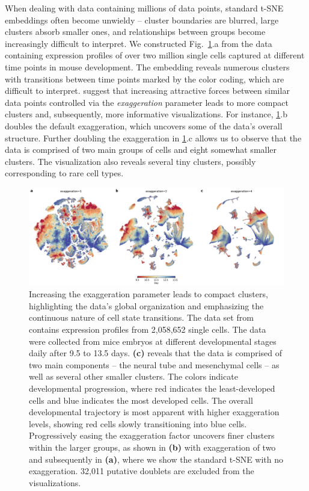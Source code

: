 \documentclass[article]{jss}
\begin{document}
When dealing with data containing millions of data points, standard t-SNE embeddings often become unwieldy -- cluster boundaries are blurred, large clusters absorb smaller ones, and relationships between groups become increasingly difficult to interpret. We constructed Fig.~\ref{fig:cao}.a from the data containing expression profiles of over two million single cells captured at different time points in mouse development. The embedding reveals numerous clusters with transitions between time points marked by the color coding, which are difficult to interpret. \citet{kobak2019art} suggest that increasing attractive forces between similar data points controlled via the \textit{exaggeration} parameter leads to more compact clusters and, subsequently, more informative visualizations. For instance, \ref{fig:cao}.b doubles the default exaggeration, which uncovers some of the data's overall structure. Further doubling the exaggeration in \ref{fig:cao}.c allows us to observe that the data is comprised of two main groups of cells and eight somewhat smaller clusters. The visualization also reveals several tiny clusters, possibly corresponding to rare cell types.

\begin{figure}[htbp]
  \includegraphics[width=\textwidth]{cao2019}
  \caption{\label{fig:cao}
  Increasing the exaggeration parameter leads to compact clusters, highlighting the data's global organization and emphasizing the continuous nature of cell state transitions. The data set from \citet{cao2019single} contains expression profiles from 2,058,652 single cells. The data were collected from mice embryos at different developmental stages daily after 9.5 to 13.5 days. \textbf{(c)} reveals that the data is comprised of two main components -- the neural tube and mesenchymal cells -- as well as several other smaller clusters. The colors indicate developmental progression, where red indicates the least-developed cells and blue indicates the most developed cells. The overall developmental trajectory is most apparent with higher exaggeration levels, showing red cells slowly transitioning into blue cells. Progressively easing the exaggeration factor uncovers finer clusters within the larger groups, as shown in \textbf{(b)} with exaggeration of two and subsequently in \textbf{(a)}, where we show the standard t-SNE with no exaggeration. 32,011 putative doublets are excluded from the visualizations. }
\end{figure}
\end{document}
